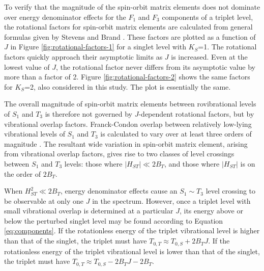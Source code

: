\documentclass[12pt]{mitthesis}
\begin{document}
To verify that the magnitude of the spin-orbit matrix elements does
not dominate over energy denominator effects for the $F_1$ and $F_3$
components of a triplet level, the rotational factors for spin-orbit
matrix elements are calculated from general formulas given by Stevens
and Brand \cite{stevens73}.  These factors are plotted as a function
of $J$ in Figure \ref{fig:rotational-factors-1} for a singlet level
with $K_S$=1.  The rotational factors quickly approach their
asymptotic limits as $J$ is increased.  Even at the lowest value of
$J$, the rotational factor never differs from its asymptotic value by
more than a factor of 2.  Figure \ref{fig:rotational-factors-2} shows
the same factors for $K_S$=2, also considered in this study.  The plot
is essentially the same.

The overall magnitude of spin-orbit matrix elements between
rovibrational levels of $S_1$ and $T_3$ is therefore not governed by
$J$-dependent rotational factors, but by vibrational overlap factors.
Franck-Condon overlap between relatively low-lying vibrational levels
of $S_1$ and $T_3$ is calculated to vary over at least three orders of
magnitude \cite{thom07}.  The resultant wide variation in spin-orbit
matrix element, arising from vibrational overlap factors, gives rise
to two classes of level crossings between $S_1$ and $T_3$ levels:
those where $\lvert H_{ST} \rvert \ll 2B_T$, and those where $\lvert
H_{ST} \rvert$ is on the order of $2B_T$.

When $H_{ST}^2 \ll 2B_T$, energy denominator effects cause an $S_1
\sim T_3$ level crossing to be observable at only one $J$ in the
spectrum.  However, once a triplet level with small vibrational
overlap is determined at a particular $J$, its energy above or below the
perturbed singlet level may be found according to Equation
\ref{eq:components}.  If the rotationless energy of the triplet
vibrational level is higher than that of the singlet, the triplet must
have $T_{0,T} \approx T_{0,S} + 2B_TJ$.  If the rotationless energy of
the triplet vibrational level is lower than that of the singlet, the
triplet must have $T_{0,T} \approx T_{0,S} - 2B_TJ - 2B_T$.
\end{document}
